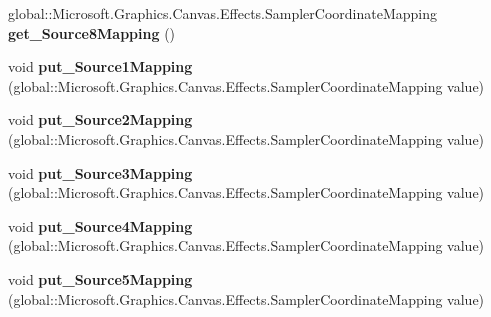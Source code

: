 \begin{DoxyCompactItemize}
\mbox{\label{interface_microsoft_1_1_graphics_1_1_canvas_1_1_effects_1_1_i_pixel_shader_effect_ad0d58d717a54a1c62a0a0a9945b6fa9f}} 
global\+::\+Microsoft.\+Graphics.\+Canvas.\+Effects.\+Sampler\+Coordinate\+Mapping {\bfseries get\+\_\+\+Source8\+Mapping} ()
\item 
\mbox{\label{interface_microsoft_1_1_graphics_1_1_canvas_1_1_effects_1_1_i_pixel_shader_effect_ae9fc29957f7616c2f8f1840213aff15e}} 
void {\bfseries put\+\_\+\+Source1\+Mapping} (global\+::\+Microsoft.\+Graphics.\+Canvas.\+Effects.\+Sampler\+Coordinate\+Mapping value)
\item 
\mbox{\label{interface_microsoft_1_1_graphics_1_1_canvas_1_1_effects_1_1_i_pixel_shader_effect_a6ea8c70f1c0143491d6190684c4d5048}} 
void {\bfseries put\+\_\+\+Source2\+Mapping} (global\+::\+Microsoft.\+Graphics.\+Canvas.\+Effects.\+Sampler\+Coordinate\+Mapping value)
\item 
\mbox{\label{interface_microsoft_1_1_graphics_1_1_canvas_1_1_effects_1_1_i_pixel_shader_effect_afd9ad8c35ce29048863ef32dadb020e8}} 
void {\bfseries put\+\_\+\+Source3\+Mapping} (global\+::\+Microsoft.\+Graphics.\+Canvas.\+Effects.\+Sampler\+Coordinate\+Mapping value)
\item 
\mbox{\label{interface_microsoft_1_1_graphics_1_1_canvas_1_1_effects_1_1_i_pixel_shader_effect_a303de4a253ea8113066464cece4fa3fa}} 
void {\bfseries put\+\_\+\+Source4\+Mapping} (global\+::\+Microsoft.\+Graphics.\+Canvas.\+Effects.\+Sampler\+Coordinate\+Mapping value)
\item 
\mbox{\label{interface_microsoft_1_1_graphics_1_1_canvas_1_1_effects_1_1_i_pixel_shader_effect_aaf82755642590951e0a07b50dc02fd4c}} 
void {\bfseries put\+\_\+\+Source5\+Mapping} (global\+::\+Microsoft.\+Graphics.\+Canvas.\+Effects.\+Sampler\+Coordinate\+Mapping value)

\end{DoxyCompactItemize}
